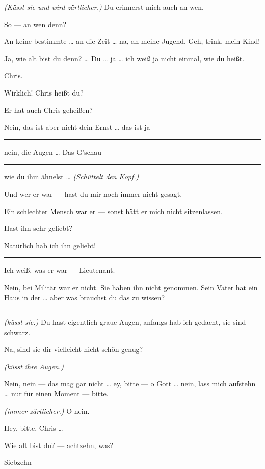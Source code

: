 \documentclass[
	final,
	a4paper,
	ngerman,
	mpinclude = true, %
	twoside = true,
	open = right,
	cleardoublepage = plain,
	DIV = 13,
	BCOR = 1cm,
	titlepage = firstiscover,
	]{scrbook}
\newcommand{\direction}[1]{\textit{(#1)}}
\newenvironment{deletion}{%
		\vspace{0.25\baselineskip}
		\hrule
		\vspace{0.25\baselineskip}
		\color{darkgray}
	}{
		\color{black}
		\vspace{0.25\baselineskip}
		\hrule 
		\vspace{0.25\baselineskip}
	}
\newcommand{\thecharacter}[1]{\textup{\textsc{#1}}\xspace}
\newcommand{\thegatte}{\thecharacter{Christian}}
\newcommand{\thesuesse}{\thecharacter{Lola}}
\newcommand{\character}[1]{\item[#1:]}
\newcommand{\gatte}{\character{\thegatte}}
\newcommand{\suesse}{\character{\thesuesse}}
\begin{document}
\begin{play}
	\gatte
	\direction{Küsst sie und wird zärtlicher.} Du erinnerst mich auch an wen.

	\suesse
	So --- an wen denn?

	\gatte
	An keine bestimmte \ldots{} an die Zeit \ldots{} na, an meine Jugend. Geh, trink, mein Kind!

	\suesse
	Ja, wie alt bist du denn? \ldots{} Du \ldots{} ja \ldots{} ich weiß ja nicht einmal, wie du heißt.

	\gatte
	Chris.

	\suesse
	Wirklich! Chris heißt du?

	\gatte
	Er hat auch Chris geheißen?

	\suesse
	Nein, das ist aber nicht dein Ernst \ldots{} das ist ja ---
	\begin{deletion}
		nein, die Augen \ldots{} Das G'schau
	\end{deletion}
	wie du ihm ähnelst \ldots{} \direction{Schüttelt den Kopf.}

	\gatte
	Und wer er war --- hast du mir noch immer nicht gesagt.

	\suesse
	Ein schlechter Mensch war er --- sonst hätt er mich nicht sitzenlassen.

	\gatte
	Hast ihn sehr geliebt?

	\suesse
	Natürlich hab ich ihn geliebt!

	\begin{deletion}
	\gatte
	Ich weiß, was er war --- Lieutenant.

	\suesse
	Nein, bei Militär war er nicht. Sie haben ihn nicht genommen. Sein Vater hat ein Haus in der \ldots{} aber was brauchst du das zu wissen?
	\end{deletion}

	\gatte
	\direction{küsst sie.} Du hast eigentlich graue Augen, anfangs hab ich gedacht, sie sind schwarz.

	\suesse
	Na, sind sie dir vielleicht nicht schön genug?

	\gatte
	\direction{küsst ihre Augen.}

	\suesse
	Nein, nein --- das mag gar nicht \ldots{} ey, bitte --- o Gott \ldots{} nein, lass mich aufstehn \ldots{} nur für einen Moment --- bitte.

	\gatte
	\direction{immer zärtlicher.} O nein.

	\suesse
	Hey, bitte, Chris \ldots{}

	\gatte
	Wie alt bist du? --- achtzehn, was?

	\suesse
	Siebzehn


\end{play}
\end{document}
